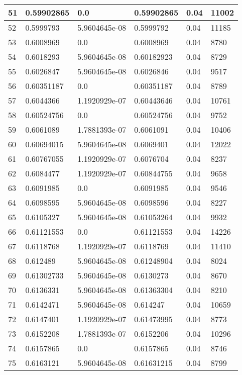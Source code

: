 \begin{longtable}{|l|l|l|l|l|l|}
51 & 0.59902865 & 0.0 & 0.59902865 & 0.04 & 11002 \\ \hline 
52 & 0.5999793 & 5.9604645e-08 & 0.5999792 & 0.04 & 11185 \\ \hline 
53 & 0.6008969 & 0.0 & 0.6008969 & 0.04 & 8780 \\ \hline 
54 & 0.6018293 & 5.9604645e-08 & 0.60182923 & 0.04 & 8729 \\ \hline 
55 & 0.6026847 & 5.9604645e-08 & 0.6026846 & 0.04 & 9517 \\ \hline 
56 & 0.60351187 & 0.0 & 0.60351187 & 0.04 & 8789 \\ \hline 
57 & 0.6044366 & 1.1920929e-07 & 0.60443646 & 0.04 & 10761 \\ \hline 
58 & 0.60524756 & 0.0 & 0.60524756 & 0.04 & 9752 \\ \hline 
59 & 0.6061089 & 1.7881393e-07 & 0.6061091 & 0.04 & 10406 \\ \hline 
60 & 0.60694015 & 5.9604645e-08 & 0.6069401 & 0.04 & 12022 \\ \hline 
61 & 0.60767055 & 1.1920929e-07 & 0.6076704 & 0.04 & 8237 \\ \hline 
62 & 0.6084477 & 1.1920929e-07 & 0.60844755 & 0.04 & 9658 \\ \hline 
63 & 0.6091985 & 0.0 & 0.6091985 & 0.04 & 9546 \\ \hline 
64 & 0.6098595 & 5.9604645e-08 & 0.6098596 & 0.04 & 8227 \\ \hline 
65 & 0.6105327 & 5.9604645e-08 & 0.61053264 & 0.04 & 9932 \\ \hline 
66 & 0.61121553 & 0.0 & 0.61121553 & 0.04 & 14226 \\ \hline 
67 & 0.6118768 & 1.1920929e-07 & 0.6118769 & 0.04 & 11410 \\ \hline 
68 & 0.612489 & 5.9604645e-08 & 0.61248904 & 0.04 & 8024 \\ \hline 
69 & 0.61302733 & 5.9604645e-08 & 0.6130273 & 0.04 & 8670 \\ \hline 
70 & 0.6136331 & 5.9604645e-08 & 0.61363304 & 0.04 & 8210 \\ \hline 
71 & 0.6142471 & 5.9604645e-08 & 0.614247 & 0.04 & 10659 \\ \hline 
72 & 0.6147401 & 1.1920929e-07 & 0.61473995 & 0.04 & 8773 \\ \hline 
73 & 0.6152208 & 1.7881393e-07 & 0.6152206 & 0.04 & 10296 \\ \hline 
74 & 0.6157865 & 0.0 & 0.6157865 & 0.04 & 8746 \\ \hline 
75 & 0.6163121 & 5.9604645e-08 & 0.61631215 & 0.04 & 8799 \\ \hline 
\end{longtable}